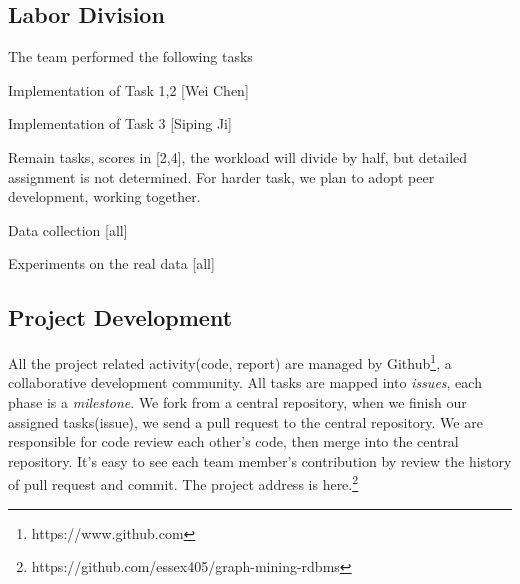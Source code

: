 
\subsection{Labor Division}

The team performed the following tasks
\bit
\item Implementation of Task 1,2 [Wei Chen]
\item Implementation of Task 3 [Siping Ji]
\item Remain tasks, scores in [2,4], the workload will divide by half, but detailed assignment is not determined. For harder task, we plan to adopt peer development, working together. 
\item Data collection [all]
\item Experiments on the real data [all]
\eit

\subsection{Project Development}
All the project related activity(code, report) are managed by Github\footnote{https://www.github.com}, a collaborative development community. All tasks are mapped into \emph{issues}, each phase is a \emph{milestone}. We fork from a central repository, when we finish our assigned tasks(issue), we send a pull request to the central repository. We are responsible for code review each other's code, then merge into the central repository. It's easy to see each team member's contribution by review the history of pull request and commit. The project address is here.\footnote{https://github.com/essex405/graph-mining-rdbms}





